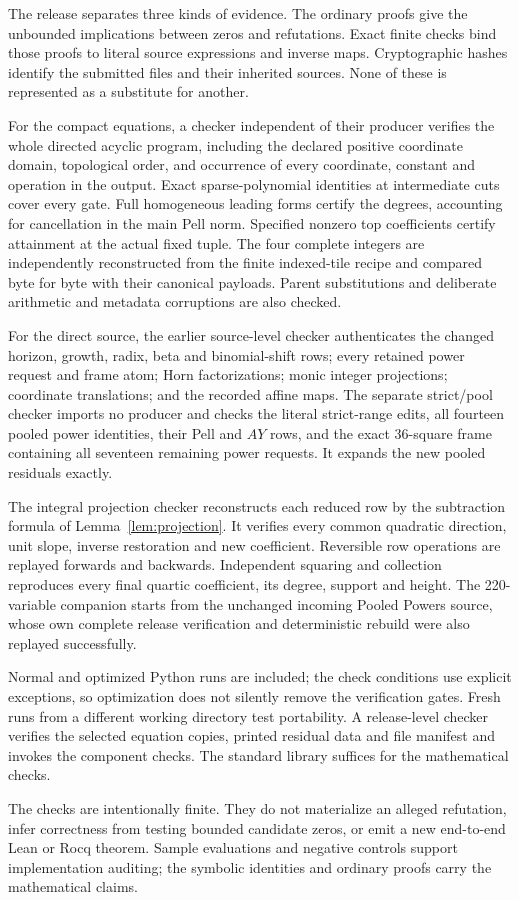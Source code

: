 The release separates three kinds of evidence. The ordinary proofs give
the unbounded implications between zeros and refutations. Exact finite
checks bind those proofs to literal source expressions and inverse maps.
Cryptographic hashes identify the submitted files and their inherited
sources. None of these is represented as a substitute for another.

For the compact equations, a checker independent of their producer
verifies the whole directed acyclic program, including the declared
positive coordinate domain, topological order, and occurrence of every
coordinate, constant and operation in the output. Exact sparse-polynomial
identities at intermediate cuts cover every gate. Full homogeneous
leading forms certify the degrees, accounting for cancellation in the
main Pell norm. Specified nonzero top coefficients certify attainment
at the actual fixed tuple. The four complete integers are independently
reconstructed from the finite indexed-tile recipe and compared byte for
byte with their canonical payloads. Parent substitutions and deliberate
arithmetic and metadata corruptions are also checked.

For the direct source, the earlier source-level checker authenticates
the changed horizon, growth, radix, beta and binomial-shift rows; every
retained power request and frame atom; Horn factorizations; monic integer
projections; coordinate translations; and the recorded affine maps.
The separate strict/pool checker imports no producer and checks the
literal strict-range edits, all fourteen pooled power identities, their
Pell and $AY$ rows, and the exact 36-square frame containing all seventeen
remaining power requests. It expands the new pooled residuals exactly.

The integral projection checker reconstructs each reduced row by the
subtraction formula of Lemma~\ref{lem:projection}. It verifies every
common quadratic direction, unit slope, inverse restoration and new
coefficient. Reversible row operations are replayed forwards and
backwards. Independent squaring and collection reproduces every final
quartic coefficient, its degree, support and height. The 220-variable
companion starts from the unchanged incoming Pooled Powers source,
whose own complete release verification and deterministic rebuild
were also replayed successfully.

Normal and optimized Python runs are included; the check conditions use
explicit exceptions, so optimization does not silently remove the
verification gates. Fresh runs from a different working directory test
portability. A release-level checker verifies the selected equation
copies, printed residual data and file manifest and invokes the component
checks. The standard library suffices for the mathematical checks.

The checks are intentionally finite. They do not materialize an alleged
refutation, infer correctness from testing bounded candidate zeros,
or emit a new end-to-end Lean or Rocq theorem. Sample evaluations and
negative controls support implementation auditing; the symbolic
identities and ordinary proofs carry the mathematical claims.
